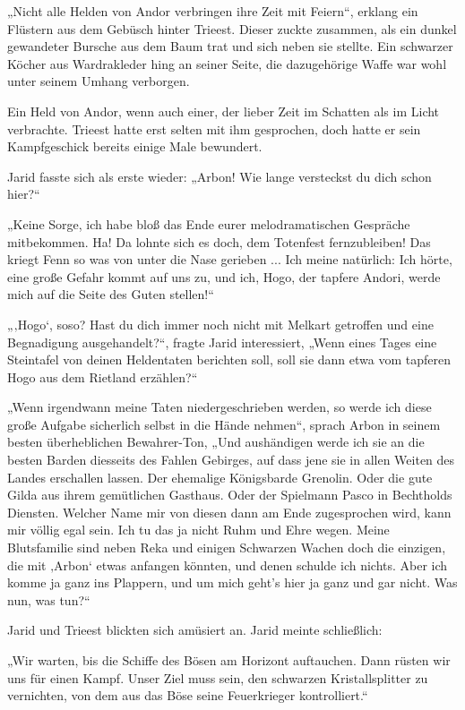„Nicht alle Helden von Andor verbringen ihre Zeit mit Feiern“, erklang ein Flüstern aus dem Gebüsch hinter Trieest. Dieser zuckte zusammen, als ein dunkel gewandeter Bursche aus dem Baum trat und sich neben sie stellte. Ein schwarzer Köcher aus Wardrakleder hing an seiner Seite, die dazugehörige Waffe war wohl unter seinem Umhang verborgen.

Ein Held von Andor, wenn auch einer, der lieber Zeit im Schatten als im Licht verbrachte. Trieest hatte erst selten mit ihm gesprochen, doch hatte er sein Kampfgeschick bereits einige Male bewundert.

Jarid fasste sich als erste wieder: „Arbon! Wie lange versteckst du dich schon hier?“

„Keine Sorge, ich habe bloß das Ende eurer melodramatischen Gespräche mitbekommen. Ha! Da lohnte sich es doch, dem Totenfest fernzubleiben! Das kriegt Fenn so was von unter die Nase gerieben ... Ich meine natürlich: Ich hörte, eine große Gefahr kommt auf uns zu, und ich, Hogo, der tapfere Andori, werde mich auf die Seite des Guten stellen!“

„‚Hogo‘, soso? Hast du dich immer noch nicht mit Melkart getroffen und eine Begnadigung ausgehandelt?“, fragte Jarid interessiert, „Wenn eines Tages eine Steintafel von deinen Heldentaten berichten soll, soll sie dann etwa vom tapferen Hogo aus dem Rietland erzählen?“

„Wenn irgendwann meine Taten niedergeschrieben werden, so werde ich diese große Aufgabe sicherlich selbst in die Hände nehmen“, sprach Arbon in seinem besten überheblichen Bewahrer-Ton, „Und aushändigen werde ich sie an die besten Barden diesseits des Fahlen Gebirges, auf dass jene sie in allen Weiten des Landes erschallen lassen. Der ehemalige Königsbarde Grenolin. Oder die gute Gilda aus ihrem gemütlichen Gasthaus. Oder der Spielmann Pasco in Bechtholds Diensten. Welcher Name mir von diesen dann am Ende zugesprochen wird, kann mir völlig egal sein. Ich tu das ja nicht Ruhm und Ehre wegen. Meine Blutsfamilie sind neben Reka und einigen Schwarzen Wachen doch die einzigen, die mit ‚Arbon‘ etwas anfangen könnten, und denen schulde ich nichts. Aber ich komme ja ganz ins Plappern, und um mich geht’s hier ja ganz und gar nicht. Was nun, was tun?“

Jarid und Trieest blickten sich amüsiert an. Jarid meinte schließlich:

„Wir warten, bis die Schiffe des Bösen am Horizont auftauchen. Dann rüsten wir uns für einen Kampf. Unser Ziel muss sein, den schwarzen Kristallsplitter zu vernichten, von dem aus das Böse seine Feuerkrieger kontrolliert.“

